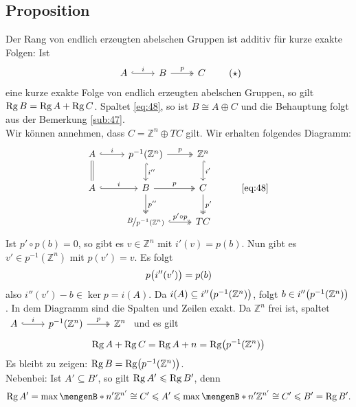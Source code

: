 \subsection[Proposition: Der Rang ist für kurze exakte Folgen endl. erz., abelscher Gruppen additiv]{Proposition} %
\label{sub:48}
Der Rang von endlich erzeugten abelschen Gruppen ist additiv für kurze exakte Folgen: Ist
\begin{equation*}
	\begin{tikzcd}
		A \rar["i",hook] & B \rar["p", two heads] & C
	\end{tikzcd} \label{eq:48}\tag{$\star$}
\end{equation*}
eine kurze exakte Folge von endlich 
erzeugten abelschen Gruppen, so gilt $\Rg B = \Rg A + \Rg C$.
Spaltet \eqref{eq:48}, so ist $B \cong A \oplus C$ und die Behauptung folgt aus der Bemerkung \ref{sub:47}. \smallskip \\
Wir können annehmen, dass $C = \mathds{Z}^n \oplus T C$ gilt. Wir erhalten folgendes Diagramm: 
\[
	\begin{tikzcd}
		A \rar["i",hook] \dar[equal] & p ^{-1}(\mathds{Z}^n) \rar["p", two heads] \dar[hook,"i''"]& \mathds{Z}^n \dar[hook,"i'"]\\
		A \rar["i",hook] & B \rar["p", two heads] \dar[two heads,"p''"]& C \dar[two heads,"p'"] & \text{\eqref{eq:48}}\\
		& \nicefrac{B}{p ^{-1}(\mathds{Z}^n)} \rar[two heads, hook,"p' \circ p"]& T C
	\end{tikzcd} 
\]
Ist $p' \circ p(b)=0$, so gibt es $v \in \mathds{Z}^n$ mit $i'(v)= p(b)$. Nun gibt es $v' \in p ^{-1}(\mathds{Z}^n)$ mit $p(v')=v$. Es folgt 
\[
	p \enbrace[\big]{i''(v')} = p(b) 
\]
also $i''(v') -b \in \ker p = i(A)$. Da $i(A) \subseteq i'' \enbrace*{p ^{-1} (\mathds{Z}^n)}$, folgt $b \in i'' \enbrace*{p ^{-1}(\mathds{Z}^n)}$.
In dem Diagramm sind die Spalten und Zeilen exakt. Da $\mathds{Z}^n$ frei ist, spaltet 
$\begin{tikzcd}
	A \rar[hook,"i"] & p^{-1}(\mathds{Z}^n) \rar["p", two heads] & \mathds{Z}^n
\end{tikzcd}$
und es gilt 
\[
	\Rg A + \Rg C = \Rg A + n = \Rg \enbrace*{p ^{-1}(\mathds{Z}^n)} 
\]
Es bleibt zu zeigen: $\Rg B = \Rg  \enbrace*{p ^{-1}(\mathds{Z}^n)}$. \medskip \\
Nebenbei: Ist $A' \subseteq B'$, so gilt $\Rg A' \le \Rg B'$, denn 
\[
	\Rg A' = \max \set[n']{\mathds{Z}^{n'} \cong C' \le A'} \le \max \set[n']{\mathds{Z}^{n'} \cong C' \le B'} = \Rg B'.
\]
